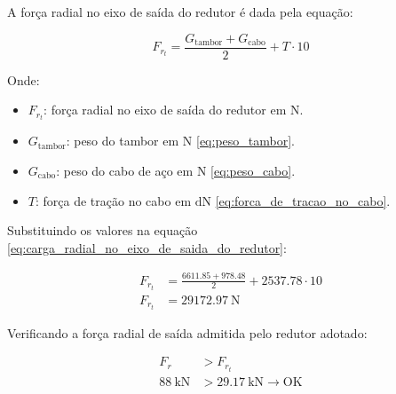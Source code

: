 A força radial no eixo de saída do redutor é dada pela equação:

\begin{equation}
  F_{r_t} = \frac{G_{\text{tambor}} + G_{\text{cabo}}}{2} + T \cdot 10
  \label{eq:carga_radial_no_eixo_de_saida_do_redutor}
\end{equation}

Onde:

\begin{itemize}[leftmargin=1.25cm]
  \item $F_{r_t}$: força radial no eixo de saída do redutor em $\si{\newton}$.
  \item $G_{\text{tambor}}$: peso do tambor em $\si{\newton}$ \eqref{eq:peso_tambor}.
  \item $G_{\text{cabo}}$: peso do cabo de aço em $\si{\newton}$ \eqref{eq:peso_cabo}.
  \item $T$: força de tração no cabo em $\si{\deca\newton}$ \eqref{eq:forca_de_tracao_no_cabo}.
\end{itemize}

\vspace{1em}

Substituindo os valores na equação \eqref{eq:carga_radial_no_eixo_de_saida_do_redutor}:

\begin{align*}
  F_{r_t} & = \frac{\num{6611.85} + \num{978.48}}{2} + \num{2537.78} \cdot 10 \\
  F_{r_t} & = \boxed{\SI{29172.97}{\newton}}
\end{align*}

Verificando a força radial de saída admitida pelo redutor adotado:

\begin{align*}
  F_r                   & > F_{r_t}                                        \\
  \SI{88}{\kilo\newton} & > \SI{29.17}{\kilo\newton} \rightarrow \text{OK}
\end{align*}
